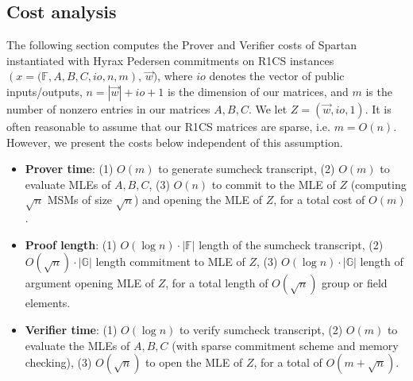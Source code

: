 


\subsection{Cost analysis}

The following section computes the Prover and Verifier costs of Spartan instantiated with Hyrax Pedersen commitments on R1CS instances $(x = \big(\mathbb{F}, A, B, C, io, n, m),\, \vec{w})$, 
where $io$ denotes the vector of public inputs/outputs, $n = |\vec{w}| + io + 1$ is the dimension of our matrices, 
and $m$ is the number of nonzero entries in our matrices $A,B,C$. We let $Z = (\vec{w}, io, 1)$. 
It is often reasonable to assume that our R1CS matrices are sparse, i.e. $m = O(n)$. However, we present the costs below independent of this assumption.

\begin{itemize}
    \item \textbf{Prover time}: (1) $O(m)$ to generate sumcheck transcript, (2) $O(m)$ to evaluate MLEs of $A,B,C$, (3) $O(n)$ to commit to the MLE of $Z$ (computing $\sqrt{n}$ MSMs of size $\sqrt{n}$) and opening the MLE of $Z$, for a total cost of $O(m)$.
    \item \textbf{Proof length}: (1) $O(\log n) \cdot |\mathbb{F}|$ length of the sumcheck transcript, (2) $O(\sqrt{n}) \cdot |\mathbb{G}|$ length commitment to MLE of $Z$, (3) $O(\log n) \cdot |\mathbb{G}|$ length of argument opening MLE of $Z$, for a total length of $O(\sqrt{n})$ group or field elements.
    \item \textbf{Verifier time}: (1) $O(\log n)$ to verify sumcheck transcript, (2) $O(m)$ to evaluate the MLEs of $A,B,C$ (with sparse commitment scheme and memory checking), (3) $O(\sqrt{n})$ to open the MLE of $Z$, for a total of $O(m + \sqrt{n})$.
\end{itemize}

